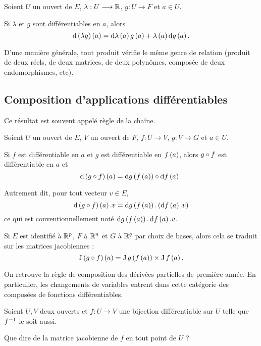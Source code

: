 \begin{prop}
Soient \(U\) un ouvert de \(E\), \(\lambda:U\longrightarrow\mathbb{R}\), \(g:U\to F\) et \(a\in U\).

Si \(\lambda\) et \(g\) sont différentiables en \(a\), alors \[\odif{\paren{\lambda g}}\paren{a}=\odif{\lambda}\paren{a}g\paren{a}+\lambda\paren{a}\odif{g}\paren{a}.\]
\end{prop}

D'une manière générale, tout produit vérifie le même genre de relation (produit de deux réels, de deux matrices, de deux polynômes, composée de deux endomorphismes, etc).

\subsection{Composition d'applications différentiables}

Ce résultat est souvent appelé règle de la chaîne.

\begin{prop}
Soient \(U\) un ouvert de \(E\), \(V\) un ouvert de \(F\), \(f:U\to V\), \(g:V\to G\) et \(a\in U\).

Si \(f\) est différentiable en \(a\) et \(g\) est différentiable en \(f\left(a\right)\), alors \(g\circ f\) est différentiable en \(a\) et \[\odif{\paren{g\rond f}}\paren{a}=\odif{g}\paren{f\paren{a}}\rond\odif{f}\paren{a}.\]
\end{prop}

Autrement dit, pour tout vecteur \(v\in E\), \[\odif{\paren{g\rond f}}\paren{a}.v=\odif{g}\paren{f\paren{a}}.\paren{\odif{f}\paren{a}.v}\] ce qui est conventionnellement noté \(\odif{g}\paren{f\paren{a}}.\odif{f}\paren{a}.v\).

\begin{prop}
Si \(E\) est identifié à \(\mathbb{R}^p\), \(F\) à \(\mathbb{R}^n\) et \(G\) à \(\mathbb{R}^q\) par choix de bases, alors cela se traduit sur les matrices jacobiennes : \[\operatorname{J}\left(g\circ f\right)\left(a\right)=\operatorname{J}g\left(f\left(a\right)\right)\times\operatorname{J}f\left(a\right).\]
\end{prop}

On retrouve la règle de composition des dérivées partielles de première année. En particulier, les changements de variables entrent dans cette catégorie des composées de fonctions différentiables.

\begin{exo}
Soient \(U,V\) deux ouverts et \(f:U\to V\) une bijection différentiable sur \(U\) telle que \(f^{-1}\) le soit aussi.

Que dire de la matrice jacobienne de \(f\) en tout point de \(U\) ?
\end{exo}

